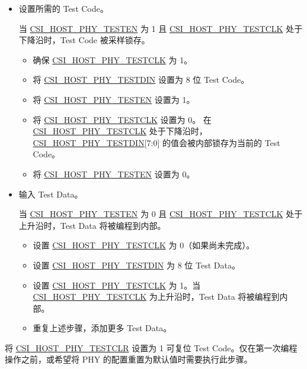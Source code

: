 \documentclass[main\_\_CN.tex]{subfiles}
\begin{document}
\begin{itemize}
    \item 设置所需的 Test Code。
    
    当 \hyperref[fielddesc:CSIHOSTPHYTESTEN]{CSI\_HOST\_PHY\_TESTEN} 为 1 且 \hyperref[fielddesc:CSIHOSTPHYTESTCLK]{CSI\_HOST\_PHY\_TESTCLK} 处于下降沿时，Test Code 被采样锁存。
    \begin{itemize}
        \item 确保 \hyperref[fielddesc:CSIHOSTPHYTESTCLK]{CSI\_HOST\_PHY\_TESTCLK} 为 1。
        \item 将 \hyperref[fielddesc:CSIHOSTPHYTESTDIN]{CSI\_HOST\_PHY\_TESTDIN} 设置为 8 位 Test Code。
        \item 将 \hyperref[fielddesc:CSIHOSTPHYTESTEN]{CSI\_HOST\_PHY\_TESTEN} 设置为 1。
        \item 将 \hyperref[fielddesc:CSIHOSTPHYTESTCLK]{CSI\_HOST\_PHY\_TESTCLK} 设置为 0。
        在 \hyperref[fielddesc:CSIHOSTPHYTESTCLK]{CSI\_HOST\_PHY\_TESTCLK} 处于下降沿时，\hyperref[fielddesc:CSIHOSTPHYTESTDIN]{CSI\_HOST\_PHY\_TESTDIN}[7:0] 的值会被内部锁存为当前的 Test Code。
        \item 将 \hyperref[fielddesc:CSIHOSTPHYTESTEN]{CSI\_HOST\_PHY\_TESTEN} 设置为 0。
    \end{itemize}
    \item 输入 Test Data。
    
    当 \hyperref[fielddesc:CSIHOSTPHYTESTEN]{CSI\_HOST\_PHY\_TESTEN} 为 0 且 \hyperref[fielddesc:CSIHOSTPHYTESTCLK]{CSI\_HOST\_PHY\_TESTCLK} 处于上升沿时，Test Data 将被编程到内部。
    \begin{itemize}
        \item 设置 \hyperref[fielddesc:CSIHOSTPHYTESTCLK]{CSI\_HOST\_PHY\_TESTCLK} 为 0（如果尚未完成）。
        \item 设置 \hyperref[fielddesc:CSIHOSTPHYTESTDIN]{CSI\_HOST\_PHY\_TESTDIN} 为 8 位 Test Data。
        \item 设置 \hyperref[fielddesc:CSIHOSTPHYTESTCLK]{CSI\_HOST\_PHY\_TESTCLK} 为 1。当 \hyperref[fielddesc:CSIHOSTPHYTESTCLK]{CSI\_HOST\_PHY\_TESTCLK} 为上升沿时，Test Data 将被编程到内部。
        \item 重复上述步骤，添加更多 Test Data。
    \end{itemize}
\end{itemize}

将 \hyperref[fielddesc:CSIHOSTPHYTESTCLR]{CSI\_HOST\_PHY\_TESTCLR} 设置为 1 可复位 Test Code。仅在第一次编程操作之前，或希望将 PHY 的配置重置为默认值时需要执行此步骤。
\end{document}
